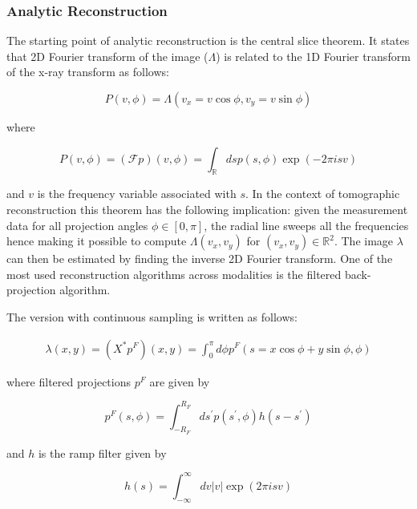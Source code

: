 \subsubsection{Analytic Reconstruction}

The starting point of analytic reconstruction is the central slice theorem. It states that 2D Fourier transform of the image ($\Lambda$) is related to the 1D Fourier transform of the x-ray transform as follows:

\begin{equation}
P(v, \phi)=\Lambda\left(v_{x}=v \cos \phi, v_{y}=v \sin \phi\right)
\end{equation} 

where

\begin{equation}
P(v, \phi)=(\mathcal{F} p)(v, \phi)=\int_{\mathbb{R}} d s p(s, \phi) \exp (-2 \pi i s v)
\end{equation}

and $v$ is the frequency variable associated with $s$. In the context of tomographic reconstruction this theorem has the following implication: given the measurement data for all projection angles $\phi \in [0,\pi]$, the radial line sweeps all the frequencies hence making it possible to compute $\Lambda(v_{x},v_{y})$ for $(v_{x},v_{y})\in \mathbb{R}^2$. The image $\lambda$ can then be estimated by finding the inverse 2D Fourier transform. 
One of the most used reconstruction algorithms across modalities is the filtered back-projection algorithm.

\newpage
The version with continuous sampling is written as follows:
 

\begin{equation}
\begin{array}{l}
\lambda(x, y)=\left(X^{*} p^{F}\right)(x, y)= 
\int_{0}^{\pi} d \phi p^{F}(s=x \cos \phi+y \sin \phi, \phi)
\end{array}
\end{equation}


where filtered projections $p^{F}$ are given by

\begin{equation}
p^{F}(s, \phi)=\int_{-R_{F}}^{R_{F}} d s^{\prime} p\left(s^{\prime}, \phi\right) h\left(s-s^{\prime}\right)
\end{equation}


and $h$ is the ramp filter given by

\begin{equation}
h(s)=\int_{-\infty}^{\infty} d v|v| \exp (2 \pi i s v)
\end{equation}




